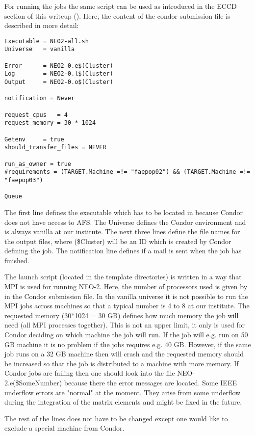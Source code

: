 \documentclass{article}
\newcommand{\vv}[1]{\texttt{\detokenize{#1}}}
\begin{document}
For running the jobs the same script can be used as introduced in the ECCD section of this writeup (\vv{run_condor.sh}). Here, the content of the condor submission file is described in more detail:
\begin{verbatim}
Executable = NEO2-all.sh
Universe   = vanilla

Error      = NEO2-0.e$(Cluster)
Log        = NEO2-0.l$(Cluster)
Output     = NEO2-0.o$(Cluster)

notification = Never

request_cpus   = 4
request_memory = 30 * 1024

Getenv     = true
should_transfer_files = NEVER

run_as_owner = true
#requirements = (TARGET.Machine =!= "faepop02") && (TARGET.Machine =!= "faepop03")

Queue 
\end{verbatim}
The first line defines the executable which has to be located in \vv{/temp/} because Condor does not have access to AFS. The Universe defines the Condor environment and is always vanilla at our institute. The next three lines define the file names for the output files, where (\$Cluster) will be an ID which is created by Condor defining the job. The notification line defines if a mail is sent when the job has finished. 

The launch script \vv{NEO2-all.sh} (located in the template directories) is written in a way that MPI is used for running NEO-2. Here, the number of processors used is given by \vv{request_cpus} in the Condor submission file. In the vanilla universe it is not possible to run the MPI jobs across machines so that a typical number is 4 to 8 at our institute. The requested memory (30*1024 = 30 GB) defines how much memory the job will need (all MPI processes together). This is not an upper limit, it only is used for Condor deciding on which machine the job will run. If the job will e.g. run on 50 GB machine it is no problem if the jobs requires e.g. 40 GB. However, if the same job runs on a 32 GB machine then \vv{neo_2.x} will crash and the requested memory should be increased so that the job is distributed to a machine with more memory. If Condor jobs are failing then one should look into the file NEO-2.e(\$SomeNumber) because there the error messages are located.
Some IEEE underflow errors are "normal" at the moment. They arise from some underflow during the integration of the matrix elements and might be fixed in the future.

The rest of the lines does not have to be changed except one would like to exclude a special machine from Condor. 
\end{document}
